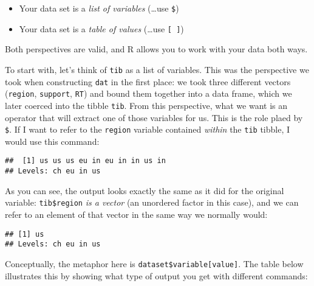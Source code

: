 \documentclass[]{book}
\newenvironment{Shaded}{\begin{snugshade}}{\end{snugshade}}
\newcommand{\DecValTok}[1]{\textcolor[rgb]{0.00,0.00,0.81}{#1}}
\newcommand{\NormalTok}[1]{#1}
\newcommand{\OperatorTok}[1]{\textcolor[rgb]{0.81,0.36,0.00}{\textbf{#1}}}
\providecommand{\tightlist}{%
  \setlength{\itemsep}{0pt}\setlength{\parskip}{0pt}}
\begin{document}
\begin{itemize}
\tightlist
\item
  Your data set is a \emph{list of variables} (\ldots{}use \texttt{\$})
\item
  Your data set is a \emph{table of values} (\ldots{}use \texttt{{[}\ {]}})
\end{itemize}

Both perspectives are valid, and R allows you to work with your data both ways.

To start with, let's think of \texttt{tib} as a list of variables. This was the perspective we took when constructing \texttt{dat} in the first place: we took three different vectors (\texttt{region}, \texttt{support}, \texttt{RT}) and bound them together into a data frame, which we later coerced into the tibble \texttt{tib}. From this perspective, what we want is an operator that will extract one of those variables for us. This is the role plaed by \texttt{\$}. If I want to refer to the \texttt{region} variable contained \emph{within} the \texttt{tib} tibble, I would use this command:

\begin{Shaded}
\end{Shaded}

\begin{verbatim}
##  [1] us us us eu in eu in in us in
## Levels: ch eu in us
\end{verbatim}

As you can see, the output looks exactly the same as it did for the original variable: \texttt{tib\$region} \emph{is a vector} (an unordered factor in this case), and we can refer to an element of that vector in the same way we normally would:

\begin{Shaded}
\end{Shaded}

\begin{verbatim}
## [1] us
## Levels: ch eu in us
\end{verbatim}

Conceptually, the metaphor here is \texttt{dataset\$variable{[}value{]}}. The table below illustrates this by showing what type of output you get with different commands:
\end{document}
